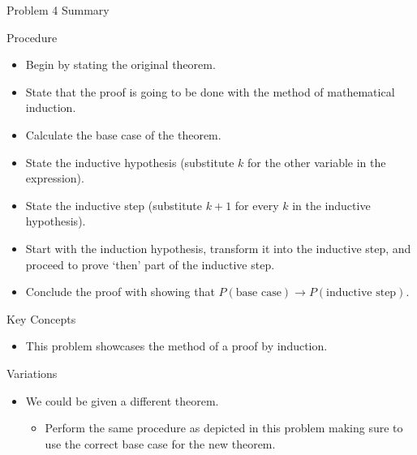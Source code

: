 \begin{summary}{Problem 4 Summary}
    \begin{statement}{Procedure}
        \begin{itemize}
            \item Begin by stating the original theorem.
            \item State that the proof is going to be done with the method of mathematical induction.
            \item Calculate the base case of the theorem.
            \item State the inductive hypothesis (substitute $k$ for the other variable in the expression).
            \item State the inductive step (substitute $k + 1$ for every $k$ in the inductive hypothesis).
            \item Start with the induction hypothesis, transform it into the inductive step, and proceed to prove `then' part of the inductive step.
            \item Conclude the proof with showing that $P(\text{base case}) \rightarrow P(\text{inductive step})$.
        \end{itemize}
    \end{statement}
    \begin{statement}{Key Concepts}
        \begin{itemize}
            \item This problem showcases the method of a proof by induction.
        \end{itemize}
    \end{statement}
    \begin{statement}{Variations}
        \begin{itemize}
            \item We could be given a different theorem.
            \begin{itemize}
                \item Perform the same procedure as depicted in this problem making sure to use the correct base case for the new theorem.
            \end{itemize}
        \end{itemize}
    \end{statement}
\end{summary}

